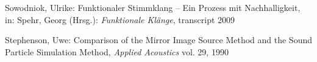 \begin{thebibliography}{}
Sowodniok, Ulrike: 
\glqq Funktionaler Stimmklang -- Ein Prozess mit Nachhalligkeit\grqq, 
in: Spehr, Georg (Hrsg.): \emph{Funktionale Klänge}, transcript 2009




Stephenson, Uwe: 
\glqq Comparison of the Mirror Image Source Method and the Sound Particle Simulation Method\grqq, 
\emph{Applied Acoustics} vol. 29, 1990


\end{thebibliography}

\clearpage\thispagestyle{empty}
\eigen  %












